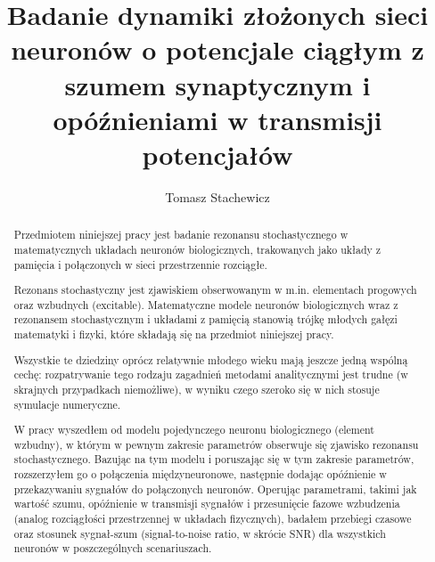 \documentclass[12pt]{article}
\title{Badanie dynamiki złożonych sieci neuronów o potencjale ciągłym
  z szumem synaptycznym i opóźnieniami w transmisji potencjałów}
\author{Tomasz Stachewicz}
\begin{document}
  \thispagestyle{empty}               %
  \stronatytulowa                     %

  \begin{abstract}
  Przedmiotem niniejszej pracy jest badanie rezonansu stochastycznego w matematycznych układach neuronów biologicznych, trakowanych jako układy z pamięcia i połączonych w sieci przestrzennie rozciągłe.

  Rezonans stochastyczny jest zjawiskiem obserwowanym w m.in. elementach progowych oraz wzbudnych (excitable). Matematyczne modele neuronów biologicznych wraz z rezonansem stochastycznym i układami z pamięcią stanowią trójkę młodych gałęzi matematyki i fizyki, które składają się na przedmiot niniejszej pracy.
  
  Wszystkie te dziedziny oprócz relatywnie młodego wieku mają jeszcze jedną wspólną cechę: rozpatrywanie tego rodzaju zagadnień metodami analitycznymi jest trudne (w skrajnych przypadkach niemożliwe), w wyniku czego szeroko się w nich stosuje symulacje numeryczne.
  
  W pracy wyszedłem od modelu pojedynczego neuronu biologicznego (element wzbudny), w którym w pewnym zakresie parametrów obserwuje się zjawisko rezonansu stochastycznego. Bazując na tym modelu i poruszając się w tym zakresie parametrów, rozszerzyłem go o połączenia międzyneuronowe, następnie dodając opóźnienie w przekazywaniu sygnałów do połączonych neuronów. Operując parametrami, takimi jak wartość szumu, opóźnienie w transmisji sygnałów i przesunięcie fazowe wzbudzenia (analog rozciągłości przestrzennej w układach fizycznych), badałem przebiegi czasowe oraz stosunek sygnał-szum (signal-to-noise ratio, w skrócie SNR) dla wszystkich neuronów w poszczególnych scenariuszach. 

  \end{abstract}

  \newpage

  \tableofcontents
  \newpage

  
  \newpage

  
  \newpage
    
  
  
  
  
  
\end{document}
